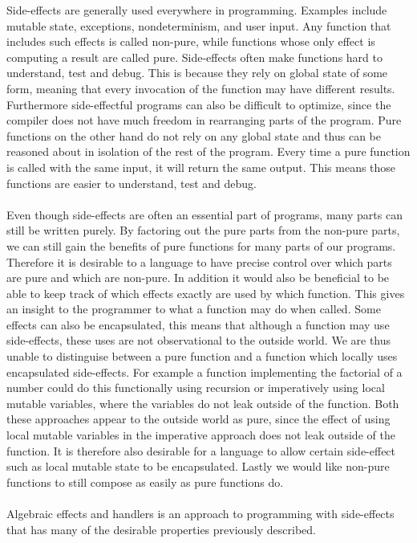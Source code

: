 Side-effects are generally used everywhere in programming.
Examples include mutable state, exceptions, nondeterminism, and user input.
Any function that includes such effects is called non-pure, while functions whose only effect is computing a result are called pure.
Side-effects often make functions hard to understand, test and debug.
This is because they rely on global state of some form, meaning that every invocation of the function may have different results.
Furthermore side-effectful programs can also be difficult to optimize, since the compiler does not have much freedom in rearranging parts of the program.
Pure functions on the other hand do not rely on any global state and thus can be reasoned about in isolation of the rest of the program.
Every time a pure function is called with the same input, it will return the same output.
This means those functions are easier to understand, test and debug.
\\\\
Even though side-effects are often an essential part of programs, many parts can still be written purely.
By factoring out the pure parts from the non-pure parts, we can still gain the benefits of pure functions for many parts of our programs.
Therefore it is desirable to a language to have precise control over which parts are pure and which are non-pure.
In addition it would also be beneficial to be able to keep track of which effects exactly are used by which function.
This gives an insight to the programmer to what a function may do when called.
Some effects can also be encapsulated, this means that although a function may use side-effects, these uses are not observational to the outside world.
We are thus unable to distinguise between a pure function and a function which locally uses encapsulated side-effects.
For example a function implementing the factorial of a number could do this functionally using recursion or imperatively using local mutable variables, where the variables do not leak outside of the function.
Both these approaches appear to the outside world as pure, since the effect of using local mutable variables in the imperative approach does not leak outside of the function.
It is therefore also desirable for a language to allow certain side-effect such as local mutable state to be encapsulated.
Lastly we would like non-pure functions to still compose as easily as pure functions do.
\\\\
Algebraic effects and handlers is an approach to programming with side-effects that has many of the desirable properties previously described.
